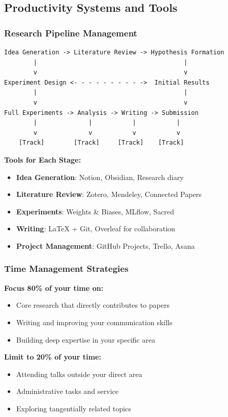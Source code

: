 \documentclass[11pt,a4paper]{article}
\begin{document}
\subsection{Productivity Systems and Tools}

\subsubsection{Research Pipeline Management}

\begin{verbatim}
Idea Generation -> Literature Review -> Hypothesis Formation
        |                                        |
        v                                        v
Experiment Design <- - - - - - - - - ->  Initial Results
        |                                        |
        v                                        v
Full Experiments -> Analysis -> Writing -> Submission
        |              |           |           |
        v              v           v           v
    [Track]        [Track]     [Track]    [Track]
\end{verbatim}

\textbf{Tools for Each Stage:}
\begin{itemize}
    \item \textbf{Idea Generation}: Notion, Obsidian, Research diary
    \item \textbf{Literature Review}: Zotero, Mendeley, Connected Papers
    \item \textbf{Experiments}: Weights \& Biases, MLflow, Sacred
    \item \textbf{Writing}: LaTeX + Git, Overleaf for collaboration
    \item \textbf{Project Management}: GitHub Projects, Trello, Asana
\end{itemize}

\subsubsection{Time Management Strategies}

\begin{tcolorbox}[colback=green!10,colframe=green!50,title=The 80/20 Rule for PhD Productivity]
\textbf{Focus 80\% of your time on:}
\begin{itemize}
    \item Core research that directly contributes to papers
    \item Writing and improving your communication skills
    \item Building deep expertise in your specific area
\end{itemize}

\textbf{Limit to 20\% of your time:}
\begin{itemize}
    \item Attending talks outside your direct area
    \item Administrative tasks and service
    \item Exploring tangentially related topics
\end{itemize}
\end{tcolorbox}
\end{document}
